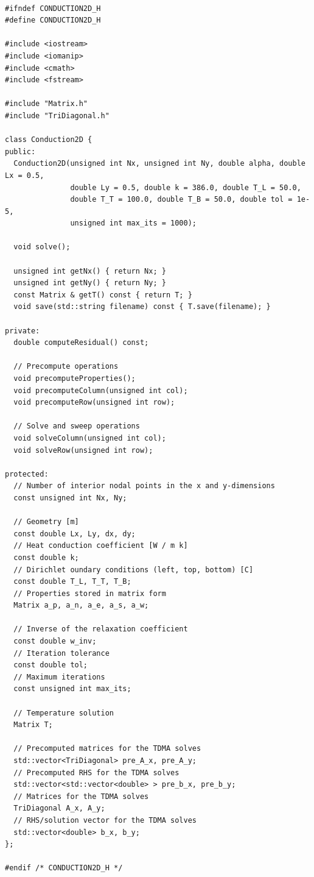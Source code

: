 \documentclass{article}
\begin{document}
\begin{verbatim}

#ifndef CONDUCTION2D_H
#define CONDUCTION2D_H

#include <iostream>
#include <iomanip>
#include <cmath>
#include <fstream>

#include "Matrix.h"
#include "TriDiagonal.h"

class Conduction2D {
public:
  Conduction2D(unsigned int Nx, unsigned int Ny, double alpha, double Lx = 0.5,
               double Ly = 0.5, double k = 386.0, double T_L = 50.0,
               double T_T = 100.0, double T_B = 50.0, double tol = 1e-5,
               unsigned int max_its = 1000);

  void solve();

  unsigned int getNx() { return Nx; }
  unsigned int getNy() { return Ny; }
  const Matrix & getT() const { return T; }
  void save(std::string filename) const { T.save(filename); }

private:
  double computeResidual() const;

  // Precompute operations
  void precomputeProperties();
  void precomputeColumn(unsigned int col);
  void precomputeRow(unsigned int row);

  // Solve and sweep operations
  void solveColumn(unsigned int col);
  void solveRow(unsigned int row);

protected:
  // Number of interior nodal points in the x and y-dimensions
  const unsigned int Nx, Ny;

  // Geometry [m]
  const double Lx, Ly, dx, dy;
  // Heat conduction coefficient [W / m k]
  const double k;
  // Dirichlet oundary conditions (left, top, bottom) [C]
  const double T_L, T_T, T_B;
  // Properties stored in matrix form
  Matrix a_p, a_n, a_e, a_s, a_w;

  // Inverse of the relaxation coefficient
  const double w_inv;
  // Iteration tolerance
  const double tol;
  // Maximum iterations
  const unsigned int max_its;

  // Temperature solution
  Matrix T;

  // Precomputed matrices for the TDMA solves
  std::vector<TriDiagonal> pre_A_x, pre_A_y;
  // Precomputed RHS for the TDMA solves
  std::vector<std::vector<double> > pre_b_x, pre_b_y;
  // Matrices for the TDMA solves
  TriDiagonal A_x, A_y;
  // RHS/solution vector for the TDMA solves
  std::vector<double> b_x, b_y;
};

#endif /* CONDUCTION2D_H */

\end{verbatim}
\end{document}
